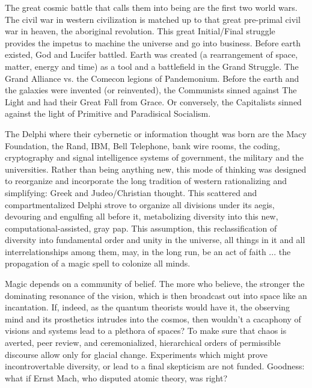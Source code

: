 The great cosmic battle that calls them
into being are the first two world wars. The
civil war in western civilization is matched
up to that great pre-primal civil war in
heaven, the aboriginal revolution. This great
Initial\slash Final struggle provides the impetus
to machine the universe and go into business. Before earth existed, God and Lucifer
battled. Earth was created (a rearrangement
of space, matter, energy and time) as a tool
and a battlefield in the Grand Struggle. The
Grand Alliance vs. the Comecon legions of
Pandemonium. Before the earth and the
galaxies were invented (or reinvented), the
Communists sinned against The Light and
had their Great Fall from Grace. Or conversely, the Capitalists sinned against the
light of Primitive and Paradisical Socialism.

The Delphi where their cybernetic or information thought was born are the Macy
Foundation, the Rand, IBM, Bell Telephone, bank wire rooms, the coding, cryptography
and signal intelligence systems of government,
the military and the universities.
Rather than being anything new, this mode
of thinking was designed to reorganize and
incorporate the long tradition of western
rationalizing and simplifying: Greek and
Judeo/Christian thought. This scattered and
compartmentalized Delphi strove to organize all divisions under its aegis, devouring
and engulfing all before it, metabolizing
diversity into this new, computational-assisted, gray pap. This assumption, this reclassification of diversity into fundamental order and unity in the universe, all things in
it and all interrelationships among them, may, in the long run, be an act of faith ... the
propagation of a magic spell to colonize all minds.

Magic depends on a community of belief.
The more who believe, the stronger the
dominating resonance of the vision, which
is then broadcast out into space like an
incantation. If, indeed, as the quantum
theorists would have it, the observing mind
and its prosthetics intrudes into the cosmos,
then wouldn't a cacaphony of visions and
systems lead to a plethora of spaces? To
make sure that chaos is averted, peer review,
and ceremonialized, hierarchical orders of
permissible discourse allow only for glacial
change. Experiments which might prove incontrovertable
diversity, or lead to a final
skepticism are not funded. Goodness: what
if Ernst Mach, who disputed atomic theory,
was right?

